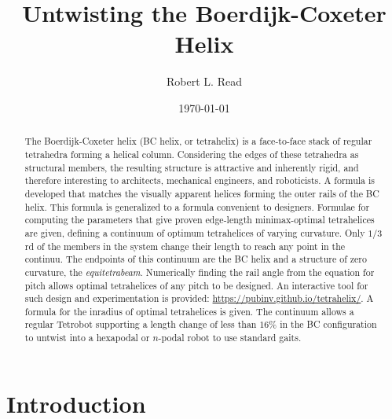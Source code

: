 \documentclass[twocolumn,10pt]{asme2ej}
\title{Untwisting the Boerdijk-Coxeter Helix}
\author{Robert L. Read
  \affiliation{
    Founder, Public Invention \\
    Austin, TX, 78704 \\
    Email: \href{mailto:read.robert@gmail.com}{read.robert@gmail.com} 
    }
}
\date{\today}
\begin{document}
\maketitle



\begin{abstract}
  The Boerdijk-Coxeter helix (BC helix, or tetrahelix) is a
  face-to-face stack of regular tetrahedra forming a helical column.  Considering the edges of
  these tetrahedra as structural members, the resulting structure is attractive and
  inherently rigid, and therefore interesting to architects,
  mechanical engineers, and roboticists.  A formula is developed that matches the
  visually apparent helices forming the outer rails of the BC helix.
  This formula is generalized to a formula convenient to designers.
  Formulae for 
  computing the
  parameters that give proven edge-length minimax-optimal tetrahelices
  are given, defining a continuum of optimum tetrahelices of varying curvature.
  Only $1/3$rd of the members in the system change their length to reach
  any point in the continuu.
  The endpoints of this continuum are the BC helix and
  a structure of zero curvature, the \emph{equitetrabeam}.
  Numerically finding the rail angle from the equation for
  pitch allows optimal tetrahelices of any pitch to be designed. 
  An interactive tool for such design and experimentation is provided: \url{https://pubinv.github.io/tetrahelix/}.
  A formula for the inradius of optimal tetrahelices is given.
  The continuum allows a regular Tetrobot supporting a length change of less than $16\%$ in the
  BC configuration to untwist into a hexapodal or $n$-podal robot
  to use standard gaits.
\end{abstract}






\section{Introduction}
\end{document}
